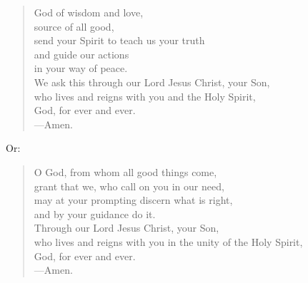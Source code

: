 \prayer

\setlength{\leftmargini}{\prayerleftmargini}

\begin{verse}
God of wisdom and love,\\
source of all good,\\
send your Spirit to teach us your truth\\
and guide our actions\\
in your way of peace.\\
We ask this through our Lord Jesus Christ, your Son,\\
who lives and reigns with you and the Holy Spirit,\\
God, for ever and ever.\\
{\color{red}---\thinspace}Amen.
\end{verse}

{\color{red}Or:}

\begin{verse}
O God, from whom all good things come,\\
grant that we, who call on you in our need,\\
may at your prompting discern what is right,\\
and by your guidance do it.\\
Through our Lord Jesus Christ, your Son,\\
who lives and reigns with you in the unity of the Holy Spirit,\\
God, for ever and ever.\\
{\color{red}---\thinspace}Amen.
\end{verse}

\setlength{\leftmargini}{\defleftmargini}